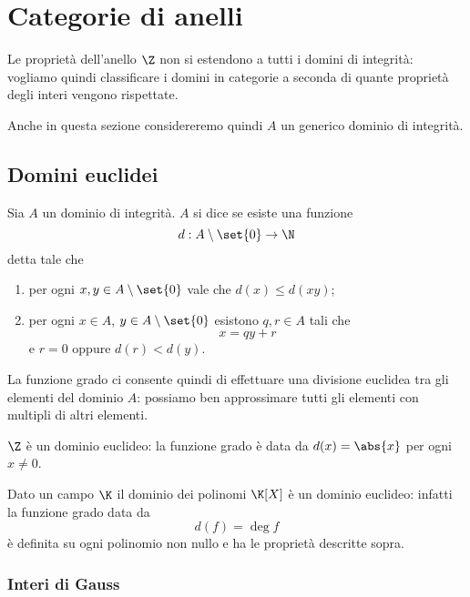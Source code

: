 \section{Categorie di anelli}

Le proprietà dell'anello $\Z$ non si estendono a tutti i domini di integrità: vogliamo quindi classificare i domini in categorie a seconda di quante proprietà degli interi vengono rispettate.

Anche in questa sezione considereremo quindi $A$ un generico dominio di integrità.

\subsection{Domini euclidei}

\begin{definition}
    Sia $A$ un dominio di integrità. $A$ si dice  se esiste una funzione \[
        d : A \setminus \set{0} \to \N    
    \] detta  tale che \begin{enumerate}[label={(\roman*)}]
        \item per ogni $x, y \in A \setminus \set{0}$ vale che $d(x) \leq d(xy)$;
        \item per ogni $x \in A$, $y \in A \setminus \set{0}$ esistono $q, r \in A$ tali che \[
            x = qy + r    
        \] e $r = 0$ oppure $d(r) < d(y)$.
    \end{enumerate}
\end{definition}

La funzione grado ci consente quindi di effettuare una divisione euclidea tra gli elementi del dominio $A$: possiamo ben approssimare tutti gli elementi con multipli di altri elementi.

\begin{example}
    $\Z$ è un dominio euclideo: la funzione grado è data da $d(x) = \abs{x}$ per ogni $x \neq 0$.
\end{example}
\begin{example}
    Dato un campo $\K$ il dominio dei polinomi $\K[X]$ è un dominio euclideo: infatti la funzione grado data da \[
        d(f) = \deg f    
    \] è definita su ogni polinomio non nullo e ha le proprietà descritte sopra.
\end{example}

\subsubsection{Interi di Gauss}

